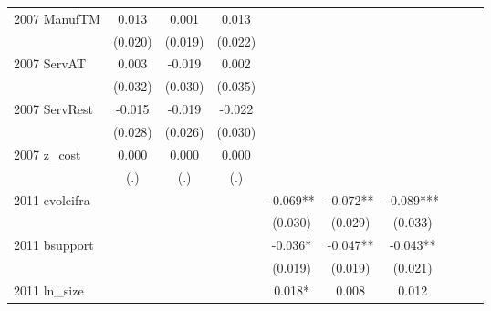 \begin{table}[htbp]
\begin{tabular}{l*{9}{c}}
2007 ManufTM        &       0.013   &       0.001   &       0.013   &               &               &               &               &               &               \\
                    &     (0.020)   &     (0.019)   &     (0.022)   &               &               &               &               &               &               \\
2007 ServAT         &       0.003   &      -0.019   &       0.002   &               &               &               &               &               &               \\
                    &     (0.032)   &     (0.030)   &     (0.035)   &               &               &               &               &               &               \\
2007 ServRest       &      -0.015   &      -0.019   &      -0.022   &               &               &               &               &               &               \\
                    &     (0.028)   &     (0.026)   &     (0.030)   &               &               &               &               &               &               \\
2007 z\_cost         &       0.000   &       0.000   &       0.000   &               &               &               &               &               &               \\
                    &         (.)   &         (.)   &         (.)   &               &               &               &               &               &               \\
2011 evolcifra      &               &               &               &      -0.069** &      -0.072** &      -0.089***&               &               &               \\
                    &               &               &               &     (0.030)   &     (0.029)   &     (0.033)   &               &               &               \\
2011 bsupport       &               &               &               &      -0.036*  &      -0.047** &      -0.043** &               &               &               \\
                    &               &               &               &     (0.019)   &     (0.019)   &     (0.021)   &               &               &               \\
2011 ln\_size        &               &               &               &       0.018*  &       0.008   &       0.012   &               &               &               \\

\end{tabular}
\end{table}
